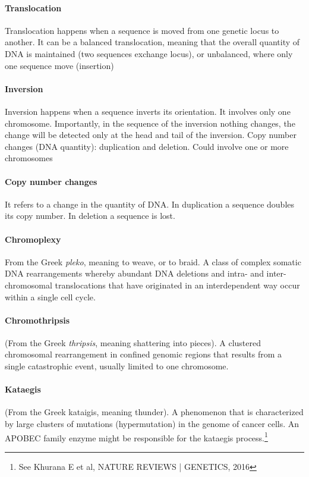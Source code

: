 			\paragraph*{Translocation}
			Translocation happens when a sequence is moved from one genetic locus to another.
			It can be a balanced translocation, meaning that the overall quantity of DNA is maintained (two sequences exchange locus), or unbalanced, where only one sequence move (insertion)

			\paragraph*{Inversion}
			Inversion happens when a sequence inverts its orientation. It involves only one 		chromosome.
			Importantly, in the sequence of the inversion nothing changes, the change will be detected only at the head and tail of the inversion.
Copy number changes (DNA quantity): duplication and deletion. Could involve one or more chromosomes

			\paragraph*{Copy number changes}
			It refers to a change in the quantity of DNA.
			In duplication a sequence doubles its copy number.
			In deletion a sequence is lost.

			\paragraph*{Chromoplexy}
			From the Greek \textit{pleko}, meaning to weave, or to braid.
A class of complex somatic DNA rearrangements whereby abundant DNA deletions
and intra- and inter-chromosomal translocations that have originated in an
interdependent way occur within a single cell cycle.

			\paragraph*{Chromothripsis}
			(From the Greek \textit{thripsis}, meaning shattering into pieces).
A clustered chromosomal rearrangement in confined genomic regions that results
from a single catastrophic event, usually limited to one chromosome.
			\paragraph*{Kataegis}
			 (From the Greek kataigis, meaning thunder).
A phenomenon that is characterized by large clusters of mutations (hypermutation) in
the genome of cancer cells. An APOBEC family enzyme might be responsible for the
kataegis process.\footnote{See  Khurana E et al, NATURE REVIEWS | GENETICS, 2016 }


